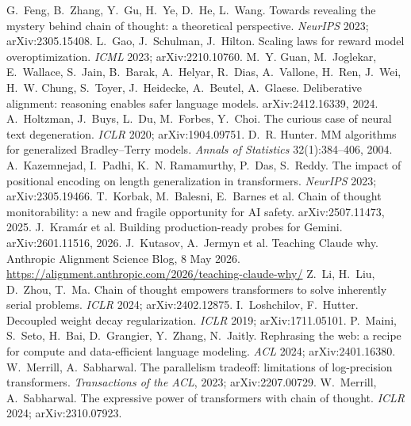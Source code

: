  G.~Feng, B.~Zhang, Y.~Gu, H.~Ye, D.~He, L.~Wang. Towards revealing the mystery behind chain of thought: a theoretical perspective. \emph{NeurIPS} 2023; arXiv:2305.15408.
 L.~Gao, J.~Schulman, J.~Hilton. Scaling laws for reward model overoptimization. \emph{ICML} 2023; arXiv:2210.10760.
 M.~Y. Guan, M.~Joglekar, E.~Wallace, S.~Jain, B.~Barak, A.~Helyar, R.~Dias, A.~Vallone, H.~Ren, J.~Wei, H.~W. Chung, S.~Toyer, J.~Heidecke, A.~Beutel, A.~Glaese. Deliberative alignment: reasoning enables safer language models. arXiv:2412.16339, 2024.
 A.~Holtzman, J.~Buys, L.~Du, M.~Forbes, Y.~Choi. The curious case of neural text degeneration. \emph{ICLR} 2020; arXiv:1904.09751.
 D.~R. Hunter. MM algorithms for generalized Bradley--Terry models. \emph{Annals of Statistics} 32(1):384--406, 2004.
 A.~Kazemnejad, I.~Padhi, K.~N. Ramamurthy, P.~Das, S.~Reddy. The impact of positional encoding on length generalization in transformers. \emph{NeurIPS} 2023; arXiv:2305.19466.
 T.~Korbak, M.~Balesni, E.~Barnes et al. Chain of thought monitorability: a new and fragile opportunity for AI safety. arXiv:2507.11473, 2025.
 J.~Kram{\'a}r et al. Building production-ready probes for Gemini. arXiv:2601.11516, 2026.
 J.~Kutasov, A.~Jermyn et al. Teaching Claude why. Anthropic Alignment Science Blog, 8 May 2026. \url{https://alignment.anthropic.com/2026/teaching-claude-why/}
 Z.~Li, H.~Liu, D.~Zhou, T.~Ma. Chain of thought empowers transformers to solve inherently serial problems. \emph{ICLR} 2024; arXiv:2402.12875.
 I.~Loshchilov, F.~Hutter. Decoupled weight decay regularization. \emph{ICLR} 2019; arXiv:1711.05101.
 P.~Maini, S.~Seto, H.~Bai, D.~Grangier, Y.~Zhang, N.~Jaitly. Rephrasing the web: a recipe for compute and data-efficient language modeling. \emph{ACL} 2024; arXiv:2401.16380.
 W.~Merrill, A.~Sabharwal. The parallelism tradeoff: limitations of log-precision transformers. \emph{Transactions of the ACL}, 2023; arXiv:2207.00729.
 W.~Merrill, A.~Sabharwal. The expressive power of transformers with chain of thought. \emph{ICLR} 2024; arXiv:2310.07923.
